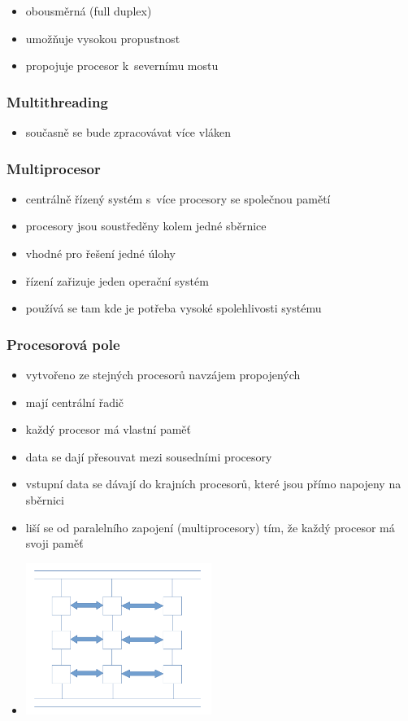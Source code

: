 \documentclass[a4paper,12pt]{article}
\providecommand{\tightlist}{%
\setlength{\itemsep}{0pt}\setlength{\parskip}{0pt}}
\begin{document}
\begin{itemize}
\tightlist
\item obousměrná (full duplex)
\item umožňuje vysokou propustnost
\item propojuje procesor k~severnímu mostu
\end{itemize}

\subsubsection{Multithreading}

\begin{itemize}
\tightlist
\item současně se bude zpracovávat více vláken
\end{itemize}

\subsubsection{Multiprocesor}

\begin{itemize}
\tightlist
\item centrálně řízený systém s~více procesory se společnou pamětí
\item procesory jsou soustředěny kolem jedné sběrnice
\item vhodné pro řešení jedné úlohy
\item řízení zařizuje jeden operační systém
\item používá se tam kde je potřeba vysoké spolehlivosti systému
\end{itemize}

\subsubsection{Procesorová pole}

\begin{itemize}
\tightlist
\item vytvořeno ze stejných procesorů navzájem propojených
\item mají centrální řadič
\item každý procesor má vlastní paměť
\item data se dají přesouvat mezi sousedními procesory
\item vstupní data se dávají do krajních procesorů, které jsou přímo
  napojeny na sběrnici
\item liší se od paralelního zapojení (multiprocesory) tím, že každý
  procesor má svoji paměť
\item[] \includegraphics[width=6.034cm]{ref/paralelni-procesory.png}
\end{itemize}
\end{document}
